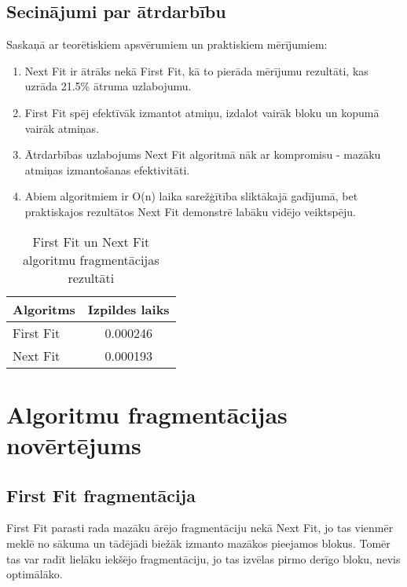 \documentclass{report}
\begin{document}
	
	\subsection{Secinājumi par ātrdarbību}
	
	Saskaņā ar teorētiskiem apsvērumiem un praktiskiem mērījumiem:
	
	\begin{enumerate}
		\item Next Fit ir ātrāks nekā First Fit, kā to pierāda mērījumu rezultāti, kas uzrāda 21.5\% ātruma uzlabojumu.
		
		\item First Fit spēj efektīvāk izmantot atmiņu, izdalot vairāk bloku un kopumā vairāk atmiņas.
		
		\item Ātrdarbības uzlabojums Next Fit algoritmā nāk ar kompromisu - mazāku atmiņas izmantošanas efektivitāti.
		
		\item Abiem algoritmiem ir O(n) laika sarežģītība sliktākajā gadījumā, bet praktiskajos rezultātos Next Fit demonstrē labāku vidējo veiktspēju.
	\end{enumerate}

	\begin{table}[h]
		\centering
		\begin{tabular}{lc}
			\toprule
			\textbf{Algoritms} & \textbf{Izpildes laiks} \\
			\midrule
			First Fit & 0.000246 \\
			Next Fit & 0.000193 \\
			\bottomrule
		\end{tabular}
		\caption{First Fit un Next Fit algoritmu fragmentācijas rezultāti}
		\label{tab:fragmentation}
	\end{table}

	
	\section{Algoritmu fragmentācijas novērtējums}
	
	\subsection{First Fit fragmentācija}
	
	First Fit parasti rada mazāku ārējo fragmentāciju nekā Next Fit, jo tas vienmēr meklē no sākuma un tādējādi biežāk izmanto mazākos pieejamos blokus. Tomēr tas var radīt lielāku iekšējo fragmentāciju, jo tas izvēlas pirmo derīgo bloku, nevis optimālāko.
	
\end{document}
